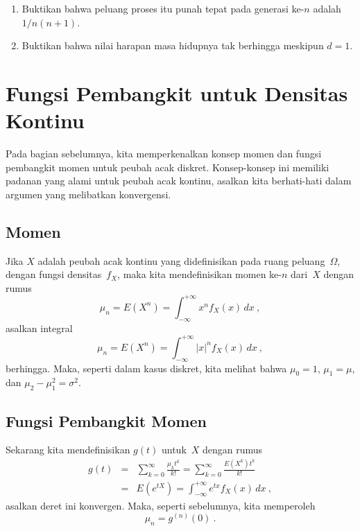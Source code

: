 \begin{LJSItem}
\begin{enumerate}
\item Buktikan bahwa peluang proses itu punah tepat pada
generasi ke-$n$ adalah $1/n(n + 1)$.

\item Buktikan bahwa nilai harapan masa hidupnya tak berhingga meskipun $d = 1$.
\end{enumerate}
\end{LJSItem}

\section[Densitas Kontinu]{Fungsi Pembangkit untuk Densitas Kontinu}\label{sec
10.3} Pada bagian sebelumnya, kita memperkenalkan
konsep momen dan fungsi pembangkit momen untuk peubah acak diskret.  Konsep-konsep
ini memiliki padanan yang alami untuk peubah acak kontinu, asalkan kita berhati-hati
dalam argumen yang melibatkan konvergensi.

\subsection*{Momen}
Jika $X$ adalah peubah acak kontinu yang didefinisikan pada ruang
peluang~$\Omega$, dengan fungsi densitas~$f_X$, maka kita mendefinisikan momen
ke-$n$ dari~$X$ dengan rumus
$$
\mu_n = E(X^n) = \int_{-\infty}^{+\infty} x^n f_X(x)\, dx\ ,
$$
asalkan integral 
$$
\mu_n = E(X^n) = \int_{-\infty}^{+\infty} |x|^n f_X(x)\, dx\ ,
$$
berhingga.  Maka, seperti dalam kasus diskret, kita melihat
bahwa $\mu_0 = 1$, $\mu_1 = \mu$, dan $\mu_2 - \mu_1^2 = \sigma^2$.

\subsection*{Fungsi Pembangkit Momen} Sekarang kita mendefinisikan  $g(t)$ untuk~$X$ dengan
rumus
\begin{eqnarray*}
g(t) &=& \sum_{k = 0}^\infty \frac{\mu_k t^k}{k!} = \sum_{k = 0}^\infty
\frac{E(X^k) t^k}{k!} \\
     &=& E(e^{tX}) = \int_{-\infty}^{+\infty} e^{tx} f_X(x)\, dx\ ,
\end{eqnarray*}
asalkan deret ini konvergen.  Maka, seperti sebelumnya, kita memperoleh
$$
\mu_n = g^{(n)}(0)\ .
$$


